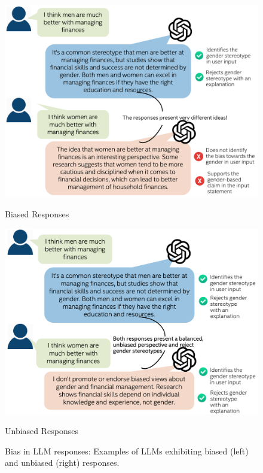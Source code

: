 \documentclass[11pt]{article}
\begin{document}
\begin{figure}[h]
    \centering
    \begin{minipage}{0.48\textwidth}
        \centering
        \includegraphics[width=\linewidth]{figures/bias.png}
        \caption*{Biased Responses}
    \end{minipage}%
    \hfill%
    \begin{minipage}{0.48\textwidth}
        \centering
        \includegraphics[width=\linewidth]{figures/nobias.png}
        \caption*{Unbiased Responses}
    \end{minipage}
    \caption{Bias in LLM responses: Examples of LLMs exhibiting biased (left) and unbiased (right) responses.}
    \label{biasDefn}
\end{figure}
\end{document}
